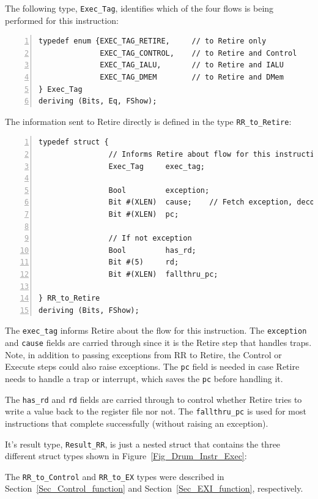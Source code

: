 The following type, \verb|Exec_Tag|, identifies which of the four
flows is being performed for this instruction:

{\small
\begin{Verbatim}[frame=single, numbers=left]
typedef enum {EXEC_TAG_RETIRE,     // to Retire only
              EXEC_TAG_CONTROL,    // to Retire and Control
              EXEC_TAG_IALU,       // to Retire and IALU
              EXEC_TAG_DMEM        // to Retire and DMem
} Exec_Tag
deriving (Bits, Eq, FShow);
\end{Verbatim}
}

The information sent to Retire directly is defined in the type
\verb|RR_to_Retire|:

{\small
\begin{Verbatim}[frame=single, numbers=left]
typedef struct {
                // Informs Retire about flow for this instruction
                Exec_Tag     exec_tag;

                Bool         exception;
                Bit #(XLEN)  cause;    // Fetch exception, decode illegal instr
                Bit #(XLEN)  pc;

                // If not exception
                Bool         has_rd;
                Bit #(5)     rd;
                Bit #(XLEN)  fallthru_pc;

} RR_to_Retire
deriving (Bits, FShow);
\end{Verbatim}
}

The \verb|exec_tag| informs Retire about the flow for this
instruction.  The {\tt exception} and {\tt cause} fields are carried
through since it is the Retire step that handles traps.  Note, in
addition to passing exceptions from RR to Retire, the Control or
Execute steps could also raise exceptions.  The {\tt pc} field is
needed in case Retire needs to handle a trap or interrupt, which saves
the {\tt pc} before handling it.

The \verb|has_rd| and \verb|rd| fields are carried through to control
whether Retire tries to write a value back to the register file nor
not.  The \verb|fallthru_pc| is used for most instructions that
complete successfully (without raising an exception).

It's result type, \verb|Result_RR|, is just a nested struct that
contains the three different struct types shown in
Figure~\ref{Fig_Drum_Instr_Exec}:

The \verb|RR_to_Control| and \verb|RR_to_EX| types were described in
Section~\ref{Sec_Control_function} and Section~\ref{Sec_EXI_function},
respectively.

